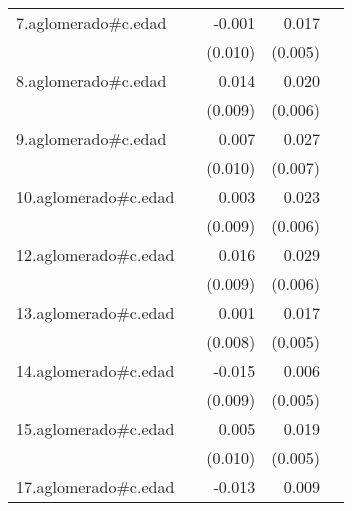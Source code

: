 {\begin{longtable}{l*{4}{D{.}{.}{-1}}}
\addlinespace
7.aglomerado#c.edad&                     &      -0.001         &       0.017\sym{**} &                     \\
            &                     &     (0.010)         &     (0.005)         &                     \\
\addlinespace
8.aglomerado#c.edad&                     &       0.014         &       0.020\sym{**} &                     \\
            &                     &     (0.009)         &     (0.006)         &                     \\
\addlinespace
9.aglomerado#c.edad&                     &       0.007         &       0.027\sym{***}&                     \\
            &                     &     (0.010)         &     (0.007)         &                     \\
\addlinespace
10.aglomerado#c.edad&                     &       0.003         &       0.023\sym{***}&                     \\
            &                     &     (0.009)         &     (0.006)         &                     \\
\addlinespace
12.aglomerado#c.edad&                     &       0.016         &       0.029\sym{***}&                     \\
            &                     &     (0.009)         &     (0.006)         &                     \\
\addlinespace
13.aglomerado#c.edad&                     &       0.001         &       0.017\sym{***}&                     \\
            &                     &     (0.008)         &     (0.005)         &                     \\
\addlinespace
14.aglomerado#c.edad&                     &      -0.015         &       0.006         &                     \\
            &                     &     (0.009)         &     (0.005)         &                     \\
\addlinespace
15.aglomerado#c.edad&                     &       0.005         &       0.019\sym{***}&                     \\
            &                     &     (0.010)         &     (0.005)         &                     \\
\addlinespace
17.aglomerado#c.edad&                     &      -0.013         &       0.009         &                     \\

\end{longtable}}
